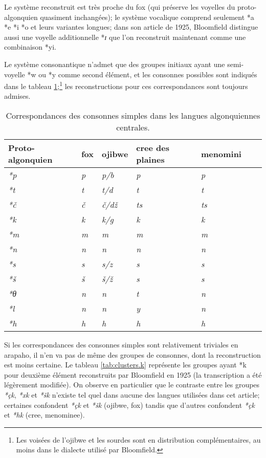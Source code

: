 \documentclass[twoside,a4paper,11pt]{article}
\newcommand{\ipa}[1]{{\phon\textit{#1}}}
\newcommand{\Σ}{\greek{Σ}}
\begin{document}
Le système reconstruit est très proche du fox (qui préserve les voyelles du proto-algonquien quasiment inchangées); le système vocalique comprend seulement *a *e *i *o et leurs variantes longues; dans son article de 1925, Bloomfield distingue aussi une voyelle additionnelle *\ipa{ɪ} que l'on reconstruit maintenant comme une combinaison *yi.

Le système consonantique n'admet que des groupes initiaux ayant une semi-voyelle *w ou *y comme second élément, et les consonnes possibles sont indiqués dans le tableau \ref{tab:c.simple};\footnote{Les voisées de l'ojibwe et les sourdes sont en distribution complémentaires, au moins dans le dialecte utilisé par Bloomfield.} les reconstructions pour ces correspondances sont toujours admises.

\begin{table}[h]
\caption{Correspondances des consonnes simples dans les langues algonquiennes centrales.} \centering  \label{tab:c.simple}
\begin{tabular}{lllllll}
\toprule
Proto-algonquien & fox & ojibwe & cree des plaines & menomini \\
\midrule
\ipa{*p} & 	\ipa{p} & 	\ipa{p/b} & 	\ipa{p} & 	\ipa{p} & 	\\
\ipa{*t} & 	\ipa{t} & 	\ipa{t/d} & 	\ipa{t} & 	\ipa{t} & 	\\
\ipa{*č} & 	\ipa{č} & 	\ipa{č/dž} & 	\ipa{ts} & 	\ipa{ts} & 	\\
\ipa{*k} & 	\ipa{k} & 	\ipa{k/g} & 	\ipa{k} & 	\ipa{k} & 	\\
\ipa{*m} & 	\ipa{m} & 	\ipa{m} & 	\ipa{m} & 	\ipa{m} & 	\\
\ipa{*n} & 	\ipa{n} & 	\ipa{n} & 	\ipa{n} & 	\ipa{n} & 	\\
\ipa{*s} & 	\ipa{s} & 	\ipa{s/z} & 	\ipa{s} & 	\ipa{s} & 	\\
\ipa{*š} & 	\ipa{š} & 	\ipa{š/ž} & 	\ipa{s} & 	\ipa{s} & 	\\
\ipa{*θ} & 	\ipa{n} & 	\ipa{n} & 	\ipa{t} & 	\ipa{n} & 	\\
\ipa{*l} & 	\ipa{n} & 	\ipa{n} & 	\ipa{y} & 	\ipa{n} & 	\\
\ipa{*h} & 	\ipa{h} & 	\ipa{h} & 	\ipa{h} & 	\ipa{h} & 	\\
\bottomrule
\end{tabular}
\end{table}

Si les correspondances des consonnes simples sont relativement triviales en arapaho, il n'en va pas de même des groupes de consonnes, dont la reconstruction est moins certaine. Le tableau \ref{tab:clusters.k} représente les groupes ayant *k pour deuxième élément reconstruits par Bloomfield en 1925 (la transcription a été légèrement modifiée). On observe en particulier que le contraste entre les  groupes  \ipa{*çk}, \ipa{*xk} et \ipa{*šk} n'existe tel quel dans aucune des langues utilisées dans cet article; certaines confondent \ipa{*çk}  et \ipa{*šk} (ojibwe, fox) tandis que d'autres confondent \ipa{*çk}  et \ipa{*hk} (cree, menominee).
 
\end{document}
